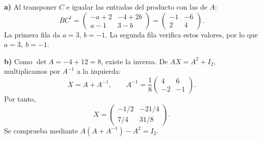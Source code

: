 \textbf{a)} Al transponer $C$ e igualar las entradas del producto con las de $A$:
\[
 BC^t=\begin{pmatrix}-a+2&-4+2b\\a-1&3-b\end{pmatrix}
      =\begin{pmatrix}-1&-6\\2&4\end{pmatrix}.
\]
La primera fila da $a=3$, $b=-1$. La segunda fila verifica estos valores, por lo que $\boxed{a=3,\ b=-1}$.

\textbf{b)} Como $\det A=-4+12=8$, existe la inversa. De $AX=A^2+I_2$, multiplicamos por $A^{-1}$ a la izquierda:
\[
 X=A+A^{-1},\qquad
 A^{-1}=\frac18\begin{pmatrix}4&6\\-2&-1\end{pmatrix}.
\]
Por tanto,
\[
 X=\boxed{\begin{pmatrix}-1/2&-21/4\\7/4&31/8\end{pmatrix}}.
\]
Se comprueba mediante $A(A+A^{-1})-A^2=I_2$.
